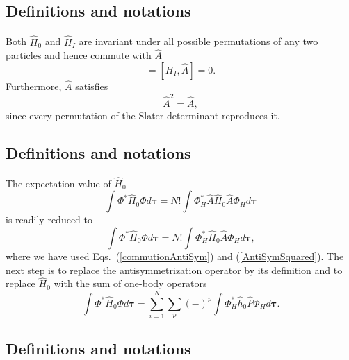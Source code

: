 \documentclass[%
twoside,                 %
final,                   %
10pt]{article}
\begin{document}
\subsection{Definitions and notations}

\paragraph{}
Both $\hat{H}_0$ and $\hat{H}_I$ are invariant under all possible permutations of any two particles
and hence commute with $\hat{A}$
\begin{equation}
  [H_0,\hat{A}] = [H_I,\hat{A}] = 0. \label{commutionAntiSym}
\end{equation}
Furthermore, $\hat{A}$ satisfies
\begin{equation}
  \hat{A}^2 = \hat{A},  \label{AntiSymSquared}
\end{equation}
since every permutation of the Slater
determinant reproduces it.



\subsection{Definitions and notations}

\paragraph{}
The expectation value of $\hat{H}_0$ 
\[
  \int \Phi^*\hat{H}_0\Phi d\mathbf{\tau} 
  = N! \int \Phi_H^*\hat{A}\hat{H}_0\hat{A}\Phi_H d\mathbf{\tau}
\]
is readily reduced to
\[
  \int \Phi^*\hat{H}_0\Phi d\mathbf{\tau} 
  = N! \int \Phi_H^*\hat{H}_0\hat{A}\Phi_H d\mathbf{\tau},
\]
where we have used Eqs.~(\ref{commutionAntiSym}) and
(\ref{AntiSymSquared}). The next step is to replace the antisymmetrization
operator by its definition and to
replace $\hat{H}_0$ with the sum of one-body operators
\[
  \int \Phi^*\hat{H}_0\Phi  d\mathbf{\tau}
  = \sum_{i=1}^N \sum_{p} (-)^p\int 
  \Phi_H^*\hat{h}_0\hat{P}\Phi_H d\mathbf{\tau}.
\]



\subsection{Definitions and notations}

\end{document}

